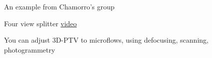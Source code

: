 
    
\begin{frame}[label=app-8]{An example from Chamorro's group}
    \centering{}
\end{frame}
    
\begin{frame}[label=app-9]{Four view splitter \href{https://www.dropbox.com/s/h6g8d373lxgkqv8/Video1a.mp4?raw=1}{video}}
\end{frame}
    

\begin{frame}[label=app-10b]{You can adjust 3D-PTV to microflows, using defocusing, scanning, photogrammetry}
\begin{center}
\begin{columns}
\end{columns}
\end{center}
\end{frame}


